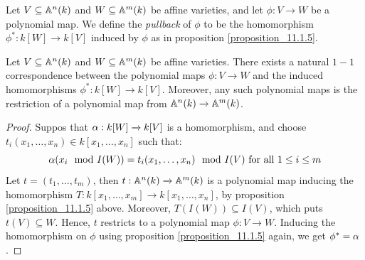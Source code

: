 \begin{definition}
  Let $V \subseteq \mathbb{A}^n(k)$ and $W \subseteq \mathbb{A}^m(k)$ be affine
  varieties, and let $\phi:V \xrightarrow{} W$ be a polynomial map.
  We define the \textit{pullback} of $\phi$ to be the homomorphism
  $\phi^*:k[W] \xrightarrow{} k[V]$ induced by $\phi$ as in
  proposition \ref{proposition_11.1.5}.
\end{definition}

\begin{proposition}\label{proposition_11.1.6}
  Let $V \subseteq \mathbb{A}^n(k)$ and $W \subseteq \mathbb{A}^m(k)$ be affine
  varieties. There exists a natural $1-1$ correspondence between the
  polynomial maps  $\phi:V \xrightarrow{} W$ and the induced
  homomorphisms $\phi^*:k[W] \xrightarrow{} k[V]$. Moreover, any such
  polynomial maps is the restriction of a polynomial map from
  $\mathbb{A}^n(k) \xrightarrow{} \mathbb{A}^m(k)$.
\end{proposition}
\begin{proof}
  Suppos that $\alpha:k[W] \xrightarrow{} k[V]$ is a homomorphism, and
  choose $t_i(x_1, \dots, x_n) \in k[x_1, \dots, x_n]$ such that:
  \begin{equation*}
    \alpha(x_i \mod{I(W)})=t_i(x_1, \dots, x_n) \mod{I(V)}
    \text{ for all } 1 \leq i \leq m
  \end{equation*}
  Let $t=(t_1, \dots, t_m)$, then $t:\mathbb{A}^n(k) \xrightarrow{} \mathbb{A}^m(k)$
  is a polynomial map inducing the homomorphism $T:k[x_1, \dots, x_m]
  \xrightarrow{} k[x_1, \dots, x_n]$, by proposition
  \ref{proposition_11.1.5} above. Moreover, $T(I(W)) \subseteq
  I(V)$, which puts $t(V) \subseteq W$. Hence, $t$ restricts to a
  polynomial map  $\phi:V \xrightarrow{} W$. Inducing the
  homomorphism on $\phi$ using proposition \ref{proposition_11.1.5}
  again, we get $\phi^*=\alpha$.
\end{proof}

